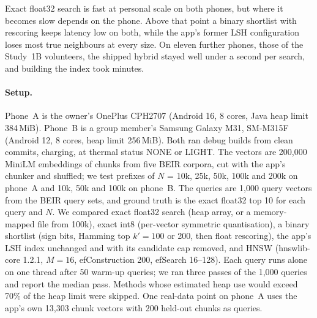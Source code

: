 \documentclass[pdflatex,sn-basic,Numbered]{sn-jnl}
\begin{document}
Exact float32 search is fast at personal scale on both phones, but where it becomes slow depends on the phone. Above that point a binary shortlist with rescoring keeps latency low on both, while the app's former LSH configuration loses most true neighbours at every size. On eleven further phones, those of the Study~1B volunteers, the shipped hybrid stayed well under a second per search, and building the index took minutes.

\paragraph{Setup.} Phone~A is the owner's OnePlus CPH2707 (Android 16, 8 cores, Java heap limit 384\,MiB). Phone~B is a group member's Samsung Galaxy M31, SM-M315F (Android 12, 8 cores, heap limit 256\,MiB). Both ran debug builds from clean commits, charging, at thermal status NONE or LIGHT. The vectors are 200,000 MiniLM embeddings of chunks from five BEIR corpora, cut with the app's chunker and shuffled; we test prefixes of $N$ = 10k, 25k, 50k, 100k and 200k on phone~A and 10k, 50k and 100k on phone~B. The queries are 1,000 query vectors from the BEIR query sets, and ground truth is the exact float32 top 10 for each query and $N$. We compared exact float32 search (heap array, or a memory-mapped file from 100k), exact int8 (per-vector symmetric quantisation), a binary shortlist (sign bits, Hamming top $k'=100$ or 200, then float rescoring), the app's LSH index unchanged and with its candidate cap removed, and HNSW (hnswlib-core 1.2.1, $M=16$, efConstruction 200, efSearch 16--128). Each query runs alone on one thread after 50 warm-up queries; we ran three passes of the 1,000 queries and report the median pass. Methods whose estimated heap use would exceed 70\% of the heap limit were skipped. One real-data point on phone~A uses the app's own 13,303 chunk vectors with 200 held-out chunks as queries.
\end{document}
